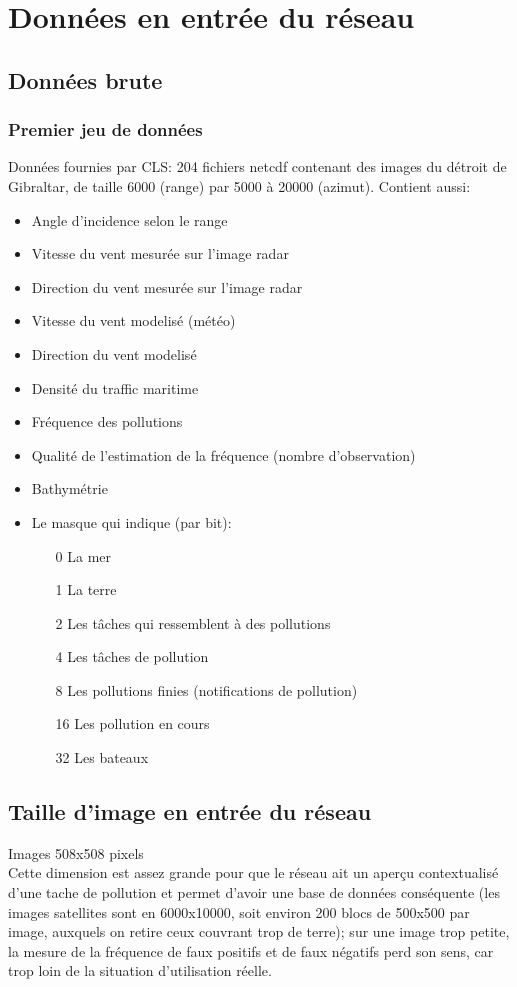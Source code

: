 \documentclass{article}
\begin{document}
\section{Données en entrée du réseau}

\subsection{Données brute}
\subsubsection{Premier jeu de données}
Données fournies par CLS: 204 fichiers netcdf contenant des images du détroit de Gibraltar, de taille 6000 (range) par 5000 à 20000 (azimut).
Contient aussi:
\begin{itemize}
\item Angle d'incidence selon le range
\item Vitesse du vent mesurée sur l'image radar
\item Direction du vent mesurée sur l'image radar
\item Vitesse du vent modelisé (météo)
\item Direction du vent modelisé
\item Densité du traffic maritime
\item Fréquence des pollutions
\item Qualité de l'estimation de la fréquence (nombre d'observation)
\item Bathymétrie
\item Le masque qui indique (par bit):
  \begin{itemize}
  \item[0] La mer
  \item[1] La terre
  \item[2] Les tâches qui ressemblent à des pollutions
  \item[4] Les tâches de pollution
  \item[8] Les pollutions finies (notifications de pollution)
  \item[16] Les pollution en cours
  \item[32] Les bateaux
  \end{itemize}
\end{itemize}

\subsection{Taille d'image en entrée du réseau}
Images 508x508 pixels\\
Cette dimension est assez grande pour que le réseau ait un aperçu contextualisé d'une tache de pollution et permet d'avoir une base de données conséquente (les images satellites sont en 6000x10000, soit environ 200 blocs de 500x500 par image, auxquels on retire ceux couvrant trop de terre); sur une image trop petite, la mesure de la fréquence de faux positifs et de faux négatifs perd son sens, car trop loin de la situation d'utilisation réelle. \\ 
\end{document}
